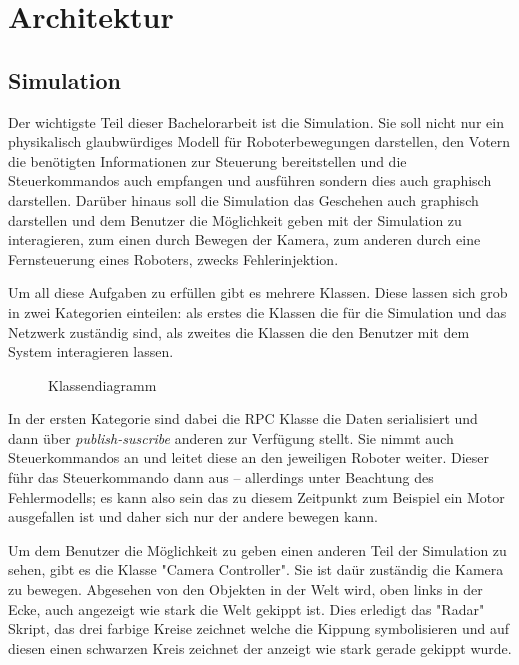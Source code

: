 \clearpage
\section{Architektur}

\subsection{Simulation}
Der wichtigste Teil dieser Bachelorarbeit ist die Simulation. Sie soll nicht nur ein physikalisch glaubw{\"{u}}rdiges Modell
f{\"{u}}r Roboterbewegungen darstellen, den Votern die ben{\"{o}}tigten Informationen zur Steuerung bereitstellen und die
Steuerkommandos auch empfangen und ausf{\"{u}}hren sondern dies auch graphisch darstellen. Dar{\"{u}}ber hinaus soll die
Simulation das Geschehen auch graphisch darstellen und dem Benutzer die M{\"{o}}glichkeit geben mit der Simulation zu
interagieren, zum einen durch Bewegen der Kamera, zum anderen durch eine Fernsteuerung eines Roboters, zwecks Fehlerinjektion.

Um all diese Aufgaben zu erf{\"{u}}llen gibt es mehrere Klassen. Diese lassen sich grob in zwei Kategorien einteilen: als
erstes die Klassen die f{\"{u}}r die Simulation und das Netzwerk zust{\"{a}}ndig sind, als zweites die Klassen die den Benutzer
mit dem System interagieren lassen.
\begin{figure}
	\centering
	\caption{Klassendiagramm}
	\label{fig:arch}
\end{figure}

In der ersten Kategorie sind dabei die RPC Klasse die Daten serialisiert und dann {\"{u}}ber \textit{publish-suscribe} anderen
zur Verf{\"{u}}gung stellt. Sie nimmt auch Steuerkommandos an und leitet diese an den jeweiligen Roboter weiter. Dieser f{\"{u}}hr
das Steuerkommando dann aus -- allerdings unter Beachtung des Fehlermodells; es kann also sein das zu diesem Zeitpunkt zum
Beispiel ein Motor ausgefallen ist und daher sich nur der andere bewegen kann.

Um dem Benutzer die M{\"{o}}glichkeit zu geben einen anderen Teil der Simulation zu sehen, gibt es die Klasse "Camera Controller".
Sie ist da{\"{u}}r zust{\"{a}}ndig die Kamera zu bewegen. Abgesehen von den Objekten in der Welt wird, oben links in der Ecke,
auch angezeigt wie stark die Welt gekippt ist. Dies erledigt das "Radar" Skript, das drei farbige Kreise zeichnet welche die
Kippung symbolisieren und auf diesen einen schwarzen Kreis zeichnet der anzeigt wie stark gerade gekippt wurde.

